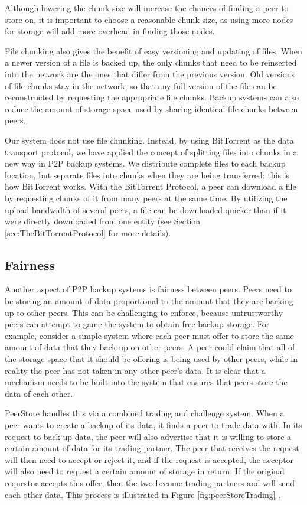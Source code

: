 \documentclass[12pt]{report}
\begin{document}
Although lowering the chunk size will increase the chances of finding a peer to store on, it is important to choose a reasonable chunk size, as using more nodes for storage will add more overhead in finding those nodes.

File chunking also gives the benefit of easy versioning and updating of files. When a newer version of a file is backed up, the only chunks that need to be reinserted into the network are the ones that differ from the previous version. Old versions of file chunks stay in the network, so that any full version of the file can be reconstructed by requesting the appropriate file chunks. Backup systems can also reduce the amount of storage space used by sharing identical file chunks between peers.

Our system does not use file chunking. Instead, by using BitTorrent as the data transport protocol, we have applied the concept of splitting files into chunks in a new way in P2P backup systems. We distribute complete files to each backup location, but separate files into chunks when they are being transferred; this is how BitTorrent works. With the BitTorrent Protocol, a peer can download a file by requesting chunks of it from many peers at the same time. By utilizing the upload bandwidth of several peers, a file can be downloaded quicker than if it were directly downloaded from one entity (see Section \ref{sec:TheBitTorrentProtocol} for more details).

\subsection{Fairness} \label{sec:Fairness_chap:Background}
Another aspect of P2P backup systems is fairness between peers. Peers need to be storing an amount of data proportional to the amount that they are backing up to other peers. This can be challenging to enforce, because untrustworthy peers can attempt to game the system to obtain free backup storage. For example, consider a simple system where each peer must offer to store the same amount of data that they back up on other peers. A peer could claim that all of the storage space that it should be offering is being used by other peers, while in reality the peer has not taken in any other peer's data. It is clear that a mechanism needs to be built into the system that ensures that peers store the data of each other.

PeerStore handles this via a combined trading and challenge system. When a peer wants to create a backup of its data, it finds a peer to trade data with. In its request to back up data, the peer will also advertise that it is willing to store a certain amount of data for its trading partner. The peer that receives the request will then need to accept or reject it, and if the request is accepted, the acceptor will also need to request a certain amount of storage in return. If the original requestor accepts this offer, then the two become trading partners and will send each other data. This process is illustrated in Figure \ref{fig:peerStoreTrading} \cite{PeerStore}.
\end{document}
